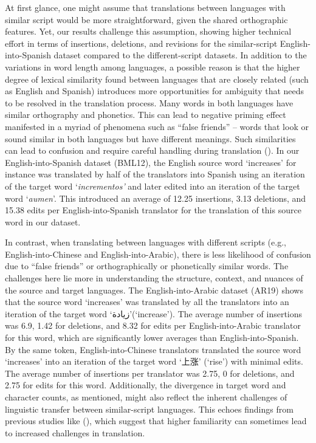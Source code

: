 \documentclass[output=paper]{langscibook}
\begin{document}
At first glance, one might assume that translations between languages with similar script would be more straightforward, given the shared orthographic features. Yet, our results challenge this assumption, showing higher technical effort in terms of insertions, deletions, and revisions for the similar-script English-into-Spanish dataset compared to the different-script datasets. In addition to the variations in word length among languages, a possible reason is that the higher degree of lexical similarity found between languages that are closely related (such as English and Spanish) introduces more opportunities for ambiguity that needs to be resolved in the translation process. Many words in both languages have similar orthography and phonetics. This can lead to negative priming effect manifested in a myriad of phenomena such as “false friends” – words that look or sound similar in both languages but have different meanings. Such similarities can lead to confusion and require careful handling during translation (\citealt{GrangerSwallow1988}). In our English-into-Spanish dataset (BML12), the English source word ‘increases’ for instance was translated by half of the translators into Spanish using an iteration of the target word ‘\textit{incrementos’} and later edited into an iteration of the target word ‘\textit{aumen}’. This introduced an average of 12.25 insertions, 3.13 deletions, and 15.38 edits per English-into-Spanish translator for the translation of this source word in our dataset.

In contrast, when translating between languages with different scripts (e.g., English-into-Chinese and English-into-Arabic), there is less likelihood of confusion due to “false friends” or orthographically or phonetically similar words. The challenges here lie more in understanding the structure, context, and nuances of the source and target languages. The English-into-Arabic dataset (AR19) shows that the source word ‘increases’ was translated by all the translators into an iteration of the target word ‘{\arabicfont زيادة}’\normalfont (‘increase’). The average number of insertions was 6.9, 1.42 for deletions, and 8.32 for edits per English-into-Arabic translator for this word, which are significantly lower averages than English-into-Spanish. By the same token, English-into-Chinese translators translated the source word ‘increases’ into an iteration of the target word ‘{\cn 上涨}’ (‘rise’) with minimal edits. The average number of insertions per translator was 2.75, 0 for deletions, and 2.75 for edits for this word. Additionally, the divergence in target word and character counts, as mentioned, might also reflect the inherent challenges of linguistic transfer between similar-script languages. This echoes findings from previous studies like (\citealt{RojoLópezEtAl2021}), which suggest that higher familiarity can sometimes lead to increased challenges in translation.
\end{document}
